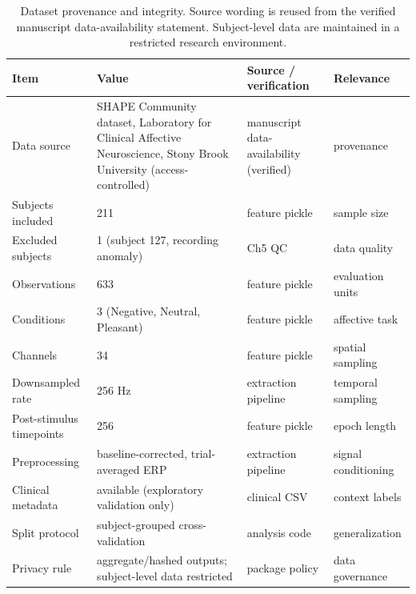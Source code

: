 \begin{table}[t]
\centering
\footnotesize
\caption{Dataset provenance and integrity. Source wording is reused from the verified manuscript data-availability statement. Subject-level data are maintained in a restricted research environment.}
\label{tab:dataset_provenance}
\begin{tabular}{@{}p{1.5cm}p{3.0cm}p{1.8cm}p{1.2cm}@{}}
\toprule
Item & Value & Source / verification & Relevance \\
\midrule
Data source & SHAPE Community dataset, Laboratory for Clinical Affective Neuroscience, Stony Brook University (access-controlled) & manuscript data-availability (verified) & provenance \\
Subjects included & 211 & feature pickle & sample size \\
Excluded subjects & 1 (subject 127, recording anomaly) & Ch5 QC & data quality \\
Observations & 633 & feature pickle & evaluation units \\
Conditions & 3 (Negative, Neutral, Pleasant) & feature pickle & affective task \\
Channels & 34 & feature pickle & spatial sampling \\
Downsampled rate & 256 Hz & extraction pipeline & temporal sampling \\
Post-stimulus timepoints & 256 & feature pickle & epoch length \\
Preprocessing & baseline-corrected, trial-averaged ERP & extraction pipeline & signal conditioning \\
Clinical metadata & available (exploratory validation only) & clinical CSV & context labels \\
Split protocol & subject-grouped cross-validation & analysis code & generalization \\
Privacy rule & aggregate/hashed outputs; subject-level data restricted & package policy & data governance \\
\bottomrule
\end{tabular}
\end{table}
